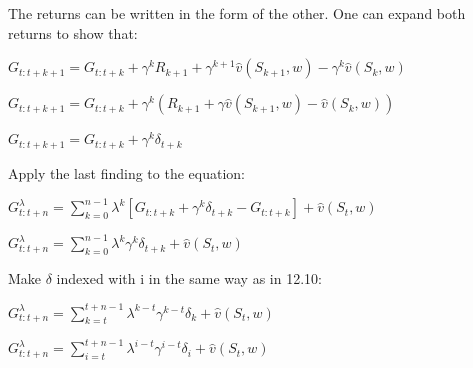 \documentclass[11pt]{article}
\begin{document}
    \hfill \break
    \noindent The returns can be written in the form of the other.
    One can expand both returns to show that:

    \noindent $ G_{t:t+k+1} = G_{t:t+k} + \gamma^{k} R_{k+1} + \gamma^{k+1} \hat{v}(S_{k+1},w) - \gamma^{k} \hat{v}(S_{k},w)   $

    \noindent $ G_{t:t+k+1} = G_{t:t+k} + \gamma^{k} ( R_{k+1} + \gamma \hat{v}(S_{k+1},w) - \hat{v}(S_{k},w)  ) $

    \noindent $ G_{t:t+k+1} = G_{t:t+k} + \gamma^{k} \delta_{t+k} $

    \hfill \break
    \noindent Apply the last finding to the equation:

    \noindent $ G_{t:t+n}^{\lambda} = \sum_{k=0}^{n-1} \lambda^{k} [G_{t:t+k} + \gamma^{k} \delta_{t+k} - G_{t:t+k}] + \hat{v}(S_t, w) $

    \noindent $ G_{t:t+n}^{\lambda} = \sum_{k=0}^{n-1} \lambda^{k} \gamma^{k} \delta_{t+k} + \hat{v}(S_t, w) $

    \hfill \break
    \noindent Make $\delta$ indexed with i in the same way as in 12.10:

    \noindent $ G_{t:t+n}^{\lambda} = \sum_{k=t}^{t+n-1} \lambda^{k-t} \gamma^{k-t} \delta_{k} + \hat{v}(S_t, w) $

    \noindent $ G_{t:t+n}^{\lambda} = \sum_{i=t}^{t+n-1} \lambda^{i-t} \gamma^{i-t} \delta_{i} + \hat{v}(S_t, w) $
\end{document}
